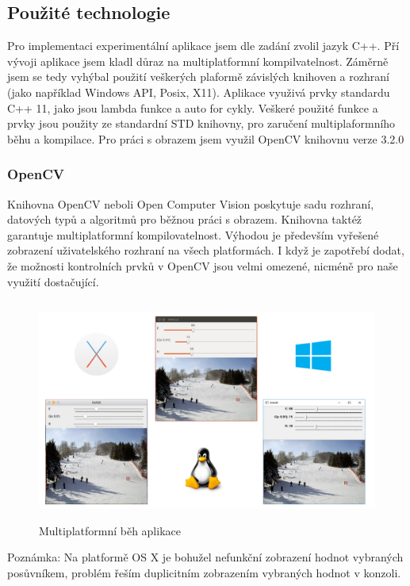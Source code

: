 \documentclass[czech, master, public, dept460, male, cpdeclaration, oneside]{diploma}
\begin{document}
\subsection{Použité technologie}
Pro implementaci experimentální aplikace jsem dle zadání zvolil jazyk C++. Pří vývoji aplikace jsem kladl důraz na multiplatformní kompilvatelnost. Záměrně jsem se tedy vyhýbal použití veškerých plaformě závislých knihoven a rozhraní (jako například Windows API, Posix, X11). Aplikace využivá prvky standardu C++ 11, jako jsou lambda funkce a auto for cykly. Veškeré použité funkce a prvky jsou použity ze standardní STD knihovny, pro zaručení multiplaformního běhu a kompilace. Pro práci s obrazem jsem využil OpenCV knihovnu verze 3.2.0

\subsubsection{OpenCV}
Knihovna OpenCV neboli Open Computer Vision poskytuje sadu rozhraní, datových typů a algoritmů pro běžnou práci s obrazem. Knihovna taktéž garantuje multiplatformní kompilovatelnost. Výhodou je především vyřešené zobrazení uživatelského rozhraní na všech platformách. I když je zapotřebí dodat, že možnosti kontrolních prvků v OpenCV jsou velmi omezené, nicméně pro naše využití dostačující. \par

\begin{figure}[H]
	\vspace*{+3.0mm}
	\centering
	\includegraphics[height=7.3cm]{Figures/explanatory/multiplatform.png}
	\caption{Multiplatformní běh aplikace}
\end{figure}
\noindent
Poznámka: Na platformě OS X je bohužel nefunkční zobrazení hodnot vybraných posůvníkem, problém řeším duplicitním zobrazením vybraných hodnot v konzoli.\par
\end{document}
